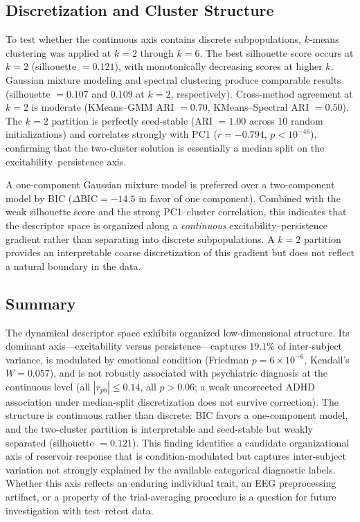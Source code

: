\subsection{Discretization and Cluster Structure}

To test whether the continuous axis contains discrete subpopulations, $k$-means clustering was applied at $k = 2$ through $k = 6$. The best silhouette score occurs at $k = 2$ (silhouette $= 0.121$), with monotonically decreasing scores at higher $k$. Gaussian mixture modeling and spectral clustering produce comparable results (silhouette $= 0.107$ and $0.109$ at $k = 2$, respectively). Cross-method agreement at $k = 2$ is moderate (KMeans--GMM ARI $= 0.70$, KMeans--Spectral ARI $= 0.50$). The $k = 2$ partition is perfectly seed-stable (ARI $= 1.00$ across $10$ random initializations) and correlates strongly with PC1 ($r = -0.794$, $p < 10^{-46}$), confirming that the two-cluster solution is essentially a median split on the excitability--persistence axis.

A one-component Gaussian mixture model is preferred over a two-component model by BIC ($\Delta\text{BIC} = -14.5$ in favor of one component). Combined with the weak silhouette score and the strong PC1--cluster correlation, this indicates that the descriptor space is organized along a \emph{continuous} excitability--persistence gradient rather than separating into discrete subpopulations. A $k = 2$ partition provides an interpretable coarse discretization of this gradient but does not reflect a natural boundary in the data.

\subsection{Summary}

The dynamical descriptor space exhibits organized low-dimensional structure. Its dominant axis---excitability versus persistence---captures $19.1\%$ of inter-subject variance, is modulated by emotional condition (Friedman $p = 6 \times 10^{-6}$, Kendall's $W = 0.057$), and is not robustly associated with psychiatric diagnosis at the continuous level (all $|r_{pb}| \leq 0.14$, all $p > 0.06$; a weak uncorrected ADHD association under median-split discretization does not survive correction). The structure is continuous rather than discrete: BIC favors a one-component model, and the two-cluster partition is interpretable and seed-stable but weakly separated (silhouette $= 0.121$). This finding identifies a candidate organizational axis of reservoir response that is condition-modulated but captures inter-subject variation not strongly explained by the available categorical diagnostic labels. Whether this axis reflects an enduring individual trait, an EEG preprocessing artifact, or a property of the trial-averaging procedure is a question for future investigation with test--retest data.